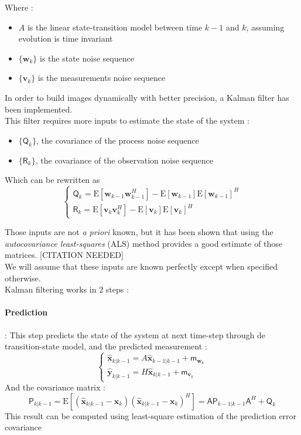 \documentclass[titlepage]{article}
\newcommand{\moy}[1]{\boldsymbol{\mathsf{m}}_{#1}}
\newcommand{\autocorr}[1]{\expval{(#1)(#1)^H}}
\renewcommand{\expval}[1]{\text{E}\left[#1\right]}
\newcommand{\w}{\boldsymbol{w}}
\renewcommand{\v}{\boldsymbol{v}}
\newcommand{\Q}{\boldsymbol{\mathsf{Q}}}
\newcommand{\R}{\boldsymbol{\mathsf{R}}}
\newcommand{\A}{\boldsymbol{\mathsf{A}}}
\newcommand{\x}{\boldsymbol{x}}
\newcommand{\y}{\boldsymbol{y}}
\newcommand{\xp}{\widehat{\x}_{k|k-1}}
\newcommand{\xa}{\widehat{\x}_{k-1|k-1}}
\newcommand{\yp}{\widehat{\y}_{k|k-1}}
\newcommand{\Pp}{\boldsymbol{\mathsf{P}}_{k|k-1}}
\newcommand{\Pa}{\boldsymbol{\mathsf{P}}_{k-1|k-1}}
\begin{document}
	Where :
	\begin{itemize}
		\item $A$ is the linear state-transition model between time $k-1$ and $k$, assuming evolution is time invariant
		\item $\{\w_k\}$ is the state noise sequence
		\item $\{\v_k\}$ is the measurements noise sequence
	\end{itemize}
	
		
	In order to build images dynamically with better precision, a Kalman filter has been implemented.\\
	
	This filter requires more inputs to estimate the state of the system :
	\begin{itemize}
		\item $\{\Q_k\}$, the covariance of the process noise sequence
		\item $\{\R_k\}$, the covariance of the observation noise sequence
	\end{itemize}

	Which can be rewritten as
	$$
		\begin{cases}
			\Q_k = \expval{\w_{k-1}\w_{k-1}^H} - \expval{\w_{k-1}}\expval{\w_{k-1}}^H \\
			\R_k = \expval{\v_{k}\v_{k}^H} - \expval{\v_k}\expval{\v_k}^H 
		\end{cases}
	$$
	
	Those inputs are not \emph{a priori} known, but it has been shown that using the \emph{autocovariance least-squares} (ALS) method provides a good estimate of those matrices. [CITATION NEEDED] \\
	We will assume that these inputs are known perfectly except when specified otherwise.\\
	
	Kalman filtering works in 2 steps :
	\paragraph{Prediction} : This step predicts the state of the system at next time-step through de transition-state model, and the predicted measurement :
	$$
	\begin{cases}
		\xp = A\xa + \moy{\w_k}\\
		\yp = H\xp + \moy{\v_k}
	\end{cases}
	$$
	And the covariance matrix :
	$$
		\Pp = \autocorr{\xp - \x_k} = \A\Pa \A^H + \Q_k
	$$
	This result can be computed using least-square estimation of the prediction error covariance\cite{intro_KF}
	
\end{document}
